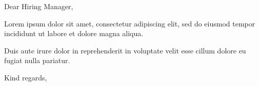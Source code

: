 \documentclass{vitaeletter}
\begin{document}
\opening{Dear Hiring Manager,}

Lorem ipsum dolor sit amet, consectetur adipiscing elit, sed do eiusmod
tempor incididunt ut labore et dolore magna aliqua.

Duis aute irure dolor in reprehenderit in voluptate velit esse cillum dolore
eu fugiat nulla pariatur.

\closing{Kind regards,}
\end{document}
